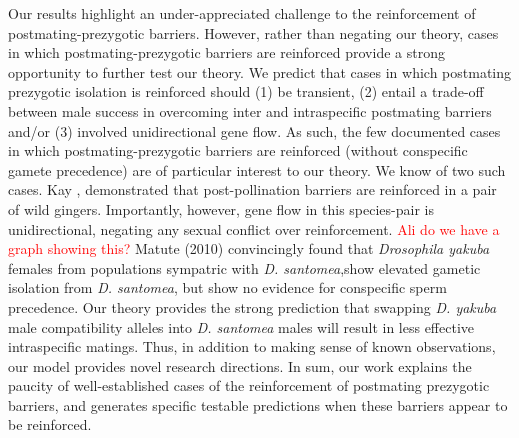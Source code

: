 \documentclass[11pt]{article}
\begin{document}
Our results highlight an under-appreciated challenge to the reinforcement of postmating-prezygotic barriers. 
However, rather than negating our theory, cases in which  postmating-prezygotic barriers are reinforced provide a strong opportunity to further test our theory.  
We predict that cases in which postmating prezygotic isolation is reinforced should (1) be transient, (2)  entail a trade-off between male success in overcoming  inter and intraspecific postmating barriers and/or (3) involved unidirectional gene flow. 
As such, the few documented cases in which postmating-prezygotic barriers are reinforced (without conspecific gamete precedence) are of particular interest to our theory.   
We know of two such cases. 
Kay \citep{Kay and Schemske, Yost and Kay}, demonstrated that post-pollination barriers are reinforced in a pair of wild gingers. 
Importantly, however, gene flow in this species-pair is unidirectional, negating any sexual conflict over reinforcement. \textcolor{red}{Ali do we have a graph showing this?} %
Matute (2010) convincingly found that \textit{Drosophila yakuba} females from populations sympatric with \textit{D. santomea},show elevated gametic isolation from \textit{D. santomea}, but show no evidence for conspecific sperm precedence. 
Our theory provides the strong prediction that swapping \textit{D. yakuba} male compatibility alleles into  \textit{D. santomea} males will result in less effective intraspecific matings. %
Thus, in addition to making sense of known observations, our model provides novel research directions.  
In sum, our work explains the paucity of well-established cases of the reinforcement of postmating prezygotic barriers, and generates specific testable predictions when these barriers appear to be reinforced. 
\end{document}
